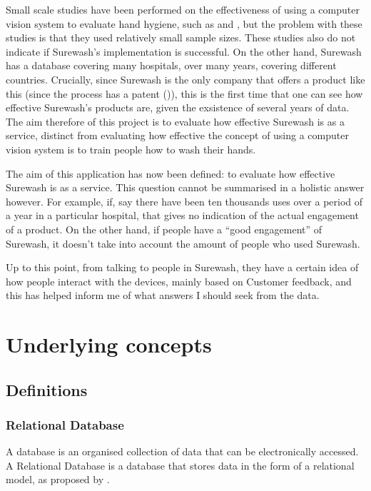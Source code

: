 Small scale studies have been performed on the effectiveness of using a computer vision system to evaluate hand hygiene, such as \cite{ghosh2011impact} and \cite{ghosh2013pilot}, but the problem with these studies is that they used relatively small sample sizes. These studies also do not indicate if Surewash's implementation is successful. On the other hand, Surewash has a database covering many hospitals, over many years, covering different countries. Crucially, since Surewash is the only company that offers a product like this (since the process has a patent (\cite{handwashpatentglanta})), this is the first time that one can see how effective Surewash's products are, given the exsistence of several years of data. The aim therefore of this project is to evaluate how effective Surewash is as a service, distinct from evaluating how effective the concept of using a computer vision system is to train people how to wash their hands.

The aim of this application has now been defined: to evaluate how effective Surewash is as a service. This question cannot be summarised in a holistic answer however. For example, if, say there have been ten thousands uses over a period of a year in a particular hospital, that gives no indication of the actual engagement of a product. On the other hand, if people have a ``good engagement'' of Surewash, it doesn't take into account the amount of people who used Surewash.

Up to this point, from talking to people in Surewash, they have a certain idea of how people interact with the devices, mainly based on Customer feedback, and this has helped inform me of what answers I should seek from the data.


\section{Underlying concepts}
    \subsection{Definitions}
        \subsubsection{Relational Database}
        A database is an organised collection of data that can be electronically accessed. A Relational Database is a database that stores data in the form of a relational model, as proposed by \cite{Codd}.
